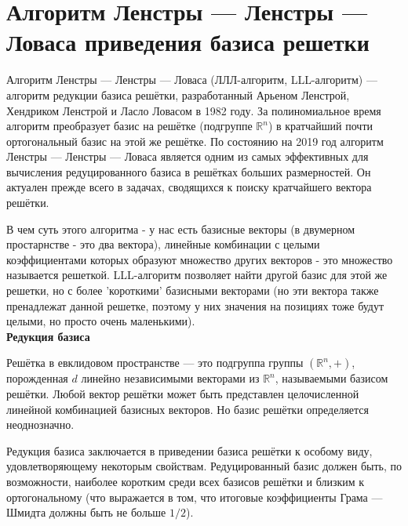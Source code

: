 \documentclass[12pt,a4paper]{scrartcl}
\begin{document}
	
\section{Алгоритм Ленстры — Ленстры — Ловаса приведения базиса решетки}

Алгоритм Ленстры — Ленстры — Ловаса (ЛЛЛ-алгоритм, LLL-алгоритм) — алгоритм редукции базиса решётки, разработанный Арьеном Ленстрой, Хендриком Ленстрой и Ласло Ловасом в 1982 году. За полиномиальное время алгоритм преобразует базис на решётке (подгруппе $\mathbb{R}^{n}$) в кратчайший почти ортогональный базис на этой же решётке. По состоянию на 2019 год алгоритм Ленстры — Ленстры — Ловаса является одним из самых эффективных для вычисления редуцированного базиса в решётках больших размерностей. Он актуален прежде всего в задачах, сводящихся к поиску кратчайшего вектора решётки. 

В чем суть этого алгоритма - у нас есть базисные векторы (в двумерном простарнстве - это два вектора), линейные комбинации с целыми коэффициентами которых образуют множество других векторов - это множество называется решеткой. LLL-алгоритм позволяет найти другой базис для этой же решетки, но с более 'короткими' базисными векторами (но эти вектора также пренадлежат данной решетке, поэтому у них значения на позициях тоже будут целыми, но просто очень маленькими).\\

\textbf{Редукция базиса}

Решётка в евклидовом пространстве — это подгруппа группы $(\mathbb {R} ^{n},+)$, порожденная $d$ линейно независимыми векторами из $\mathbb{R}^{n}$, называемыми базисом решётки. Любой вектор решётки может быть представлен целочисленной линейной комбинацией базисных векторов. Но базис решётки определяется неоднозначно.

Редукция базиса заключается в приведении базиса решётки к особому виду, удовлетворяющему некоторым свойствам. Редуцированный базис должен быть, по возможности, наиболее коротким среди всех базисов решётки и близким к ортогональному (что выражается в том, что итоговые коэффициенты Грама — Шмидта должны быть не больше $1/2$).
\end{document}
